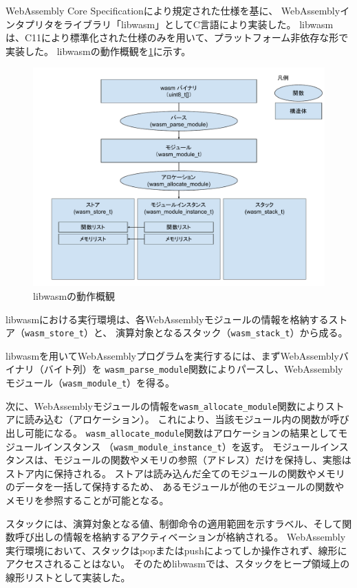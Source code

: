 WebAssembly Core Specification\cite{wasm_spec}により規定された仕様を基に、
WebAssemblyインタプリタをライブラリ「libwasm」としてC言語により実装した。
libwasmは、C11により標準化された仕様のみを用いて、プラットフォーム非依存な形で実装した。
libwasmの動作概観を\ref{fig:libwasm_arch}に示す。

\begin{figure}[htbp]
  \caption{libwasmの動作概観}
  \label{fig:libwasm_arch}
  \begin{center}
    \includegraphics[bb=0 0 960 720,width=12cm]{img/libwasm_arch.pdf}
  \end{center}
\end{figure}

libwasmにおける実行環境は、各WebAssemblyモジュールの情報を格納するストア（\verb|wasm_store_t|）と、
演算対象となるスタック（\verb|wasm_stack_t|）から成る。

libwasmを用いてWebAssemblyプログラムを実行するには、まずWebAssemblyバイナリ（バイト列）を
\verb|wasm_parse_module|関数によりパースし、WebAssemblyモジュール（\verb|wasm_module_t|）を得る。

次に、WebAssemblyモジュールの情報を\verb|wasm_allocate_module|関数によりストアに読み込む（アロケーション）。
これにより、当該モジュール内の関数が呼び出し可能になる。
\verb|wasm_allocate_module|関数はアロケーションの結果としてモジュールインスタンス
（\verb|wasm_module_instance_t|）を返す。
モジュールインスタンスは、モジュールの関数やメモリの参照（アドレス）だけを保持し、実態はストア内に保持される。
ストアは読み込んだ全てのモジュールの関数やメモリのデータを一括して保持するため、
あるモジュールが他のモジュールの関数やメモリを参照することが可能となる。

スタックには、演算対象となる値、制御命令の適用範囲を示すラベル、そして関数呼び出しの情報を格納するアクティベーションが格納される。
WebAssembly実行環境において、スタックはpopまたはpushによってしか操作されず、線形にアクセスされることはない。
そのためlibwasmでは、スタックをヒープ領域上の線形リストとして実装した。
